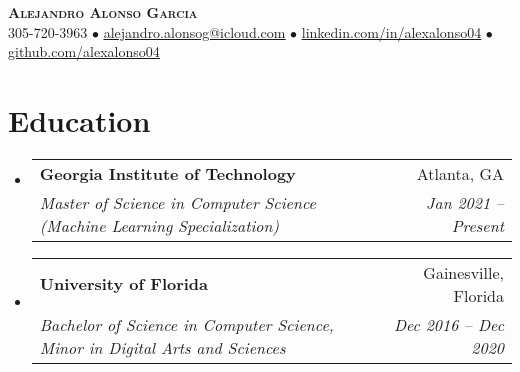 \documentclass[letterpaper,11pt]{article}
\makeatletter
\newcommand{\resumeSubheading}[4]{
  \vspace{-1pt}\item
    \begin{tabular*}{0.97\textwidth}[t]{l@{\extracolsep{\fill}}r}
      \textbf{#1} & #2 \\
      \textit{\small#3} & \textit{\small #4} \\
    \end{tabular*}\vspace{-5pt}
}
\newcommand{\resumeSubHeadingListStart}{\begin{itemize}[leftmargin=0.15in, label={}]}
\newcommand{\resumeSubHeadingListEnd}{\end{itemize}}
\makeatother
\begin{document}
\begin{center}
  \textbf{\Large \scshape Alejandro Alonso Garcia} \\ \vspace{1pt}
  \small 305-720-3963 $\bullet$ \href{mailto:alejandro.alonsog@icloud.com}{\underline{alejandro.alonsog@icloud.com}} $\bullet$ 
  \href{https://www.linkedin.com/in/alexalonso04/}{\underline{linkedin.com/in/alexalonso04}} $\bullet$
  \href{https://github.com/Alexalonso04}{\underline{github.com/alexalonso04}}
\end{center}


\section{Education}
  \resumeSubHeadingListStart
    \resumeSubheading
      {Georgia Institute of Technology}{Atlanta, GA}
      {Master of Science in Computer Science (Machine Learning Specialization)}{Jan 2021 -- Present}
    \resumeSubheading
      {University of Florida}{Gainesville, Florida}
      {Bachelor of Science in Computer Science, Minor in Digital Arts and Sciences}{Dec 2016 -- Dec 2020}
  \resumeSubHeadingListEnd


\end{document}

